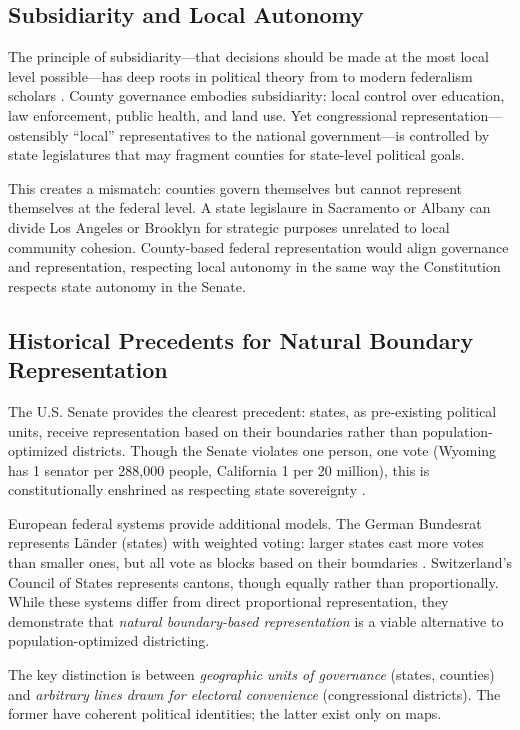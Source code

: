 \subsection{Subsidiarity and Local Autonomy}

The principle of subsidiarity---that decisions should be made at the most local level possible---has deep roots in political theory from \citet{tocqueville1835democracy} to modern federalism scholars \citep{ostrom1999polycentricity}. County governance embodies subsidiarity: local control over education, law enforcement, public health, and land use. Yet congressional representation---ostensibly ``local'' representatives to the national government---is controlled by state legislatures that may fragment counties for state-level political goals.

This creates a mismatch: counties govern themselves but cannot represent themselves at the federal level. A state legislaure in Sacramento or Albany can divide Los Angeles or Brooklyn for strategic purposes unrelated to local community cohesion. County-based federal representation would align governance and representation, respecting local autonomy in the same way the Constitution respects state autonomy in the Senate.

\subsection{Historical Precedents for Natural Boundary Representation}

The U.S. Senate provides the clearest precedent: states, as pre-existing political units, receive representation based on their boundaries rather than population-optimized districts. Though the Senate violates one person, one vote (Wyoming has 1 senator per 288,000 people, California 1 per 20 million), this is constitutionally enshrined as respecting state sovereignty \citep{lee2010sizing}.

European federal systems provide additional models. The German Bundesrat represents L\"ander (states) with weighted voting: larger states cast more votes than smaller ones, but all vote as blocks based on their boundaries \citep{gunlicks2003german}. Switzerland's Council of States represents cantons, though equally rather than proportionally. While these systems differ from direct proportional representation, they demonstrate that \emph{natural boundary-based representation} is a viable alternative to population-optimized districting.

The key distinction is between \emph{geographic units of governance} (states, counties) and \emph{arbitrary lines drawn for electoral convenience} (congressional districts). The former have coherent political identities; the latter exist only on maps.
